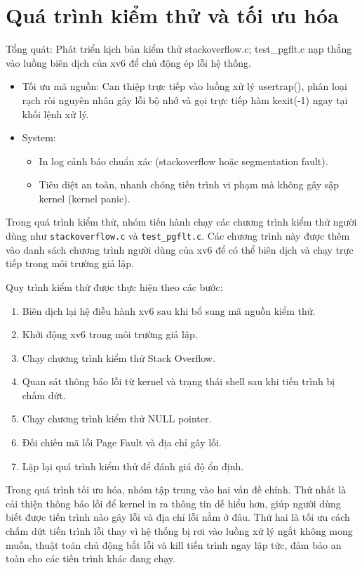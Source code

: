 \section{Quá trình kiểm thử và tối ưu hóa}
Tổng quát:
Phát triển kịch bản kiểm thử stackoverflow.c;  test\_pgflt.c nạp thẳng vào luồng biên dịch của xv6 để chủ động ép lỗi hệ thống.
\begin{itemize}
    \item Tối ưu mã nguồn: Can thiệp trực tiếp vào luồng xử lý usertrap(), phân loại rạch ròi nguyên nhân gây lỗi bộ nhớ và gọi trực tiếp hàm kexit(-1) ngay tại khối lệnh xử lý.
    \item System:
    \begin{itemize}
        \item In log cảnh báo chuẩn xác (stackoverflow hoặc segmentation fault).
        \item Tiêu diệt an toàn, nhanh chóng tiến trình vi phạm mà không gây sập kernel (kernel panic).
    \end{itemize}
\end{itemize}
Trong quá trình kiểm thử, nhóm tiến hành chạy các chương trình kiểm thử người dùng như \texttt{stackoverflow.c} và \texttt{test\_pgflt.c}. Các chương trình này được thêm vào danh sách chương trình người dùng của xv6 để có thể biên dịch và chạy trực tiếp trong môi trường giả lập.

Quy trình kiểm thử được thực hiện theo các bước:

\begin{enumerate}
    \item Biên dịch lại hệ điều hành xv6 sau khi bổ sung mã nguồn kiểm thử.
    \item Khởi động xv6 trong môi trường giả lập.
    \item Chạy chương trình kiểm thử Stack Overflow.
    \item Quan sát thông báo lỗi từ kernel và trạng thái shell sau khi tiến trình bị chấm dứt.
    \item Chạy chương trình kiểm thử NULL pointer.
    \item Đối chiếu mã lỗi Page Fault và địa chỉ gây lỗi.
    \item Lặp lại quá trình kiểm thử để đánh giá độ ổn định.
\end{enumerate}

Trong quá trình tối ưu hóa, nhóm tập trung vào hai vấn đề chính. Thứ nhất là cải thiện thông báo lỗi để kernel in ra thông tin dễ hiểu hơn, giúp người dùng biết được tiến trình nào gây lỗi và địa chỉ lỗi nằm ở đâu. Thứ hai là tối ưu cách chấm dứt tiến trình lỗi thay vì hệ thống bị rơi vào luồng xử lý ngắt không mong muốn, thuật toán chủ động bắt lỗi và kill tiến trình ngay lập tức, đảm bảo an toàn cho các tiến trình khác đang chạy.

